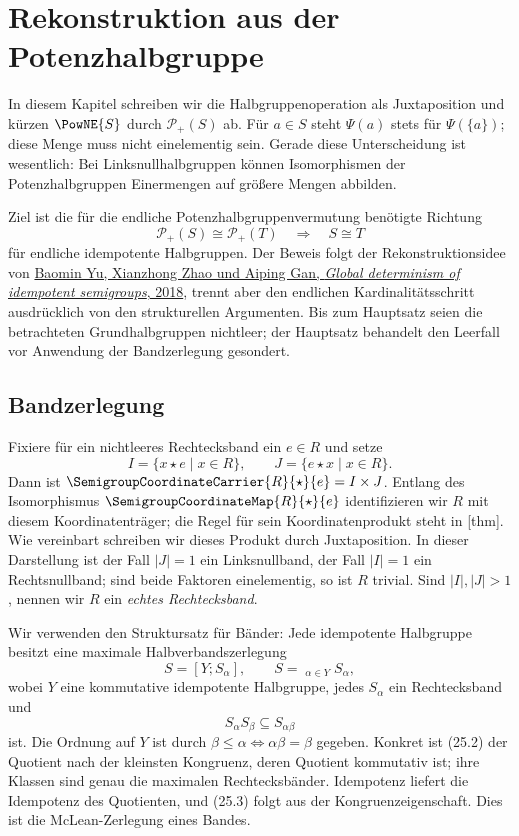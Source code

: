 \documentclass[main.tex]{subfiles}
\begin{document}
\chapter{Rekonstruktion aus der Potenzhalbgruppe}

In diesem Kapitel schreiben wir die Halbgruppenoperation als Juxtaposition
und kürzen \(\PowNE{S}\) durch \(\mathcal P_+(S)\) ab.  Für
\(a\in S\) steht \(\Psi(a)\) stets für \(\Psi(\{a\})\); diese Menge
muss nicht einelementig sein.  Gerade diese Unterscheidung ist wesentlich:
Bei Linksnullhalbgruppen können Isomorphismen der Potenzhalbgruppen
Einermengen auf größere Mengen abbilden.

Ziel ist die für die endliche Potenzhalbgruppenvermutung benötigte
Richtung
\[
  \mathcal P_+(S)\cong\mathcal P_+(T)
  \quad\Longrightarrow\quad S\cong T
\]
für endliche idempotente Halbgruppen.  Der Beweis folgt der
Rekonstruktionsidee von
\href{https://doi.org/10.1080/00927872.2017.1319474}%
  {Baomin Yu, Xianzhong Zhao und Aiping Gan,
  \emph{Global determinism of idempotent semigroups}, 2018},
trennt aber den endlichen Kardinalitätsschritt ausdrücklich von den
strukturellen Argumenten.
Bis zum Hauptsatz seien die betrachteten Grundhalbgruppen nichtleer; der
Hauptsatz behandelt den Leerfall vor Anwendung der Bandzerlegung gesondert.

\section{Bandzerlegung}

Fixiere f\"ur ein nichtleeres Rechtecksband ein \(e\in R\) und setze
\[
 I=\{x\star e\mid x\in R\},\qquad
 J=\{e\star x\mid x\in R\}.
\]
Dann ist \(\SemigroupCoordinateCarrier{R}{\star}{e}=I\times J\).
Entlang des Isomorphismus
\(\SemigroupCoordinateMap{R}{\star}{e}\) identifizieren wir \(R\) mit
diesem Koordinatentr\"ager; die Regel für sein Koordinatenprodukt steht in
[thm]. Wie vereinbart
schreiben wir dieses Produkt durch Juxtaposition.  In dieser Darstellung ist der Fall
\(|J|=1\) ein
Linksnullband, der Fall \(|I|=1\) ein Rechtsnullband; sind beide Faktoren
einelementig, so ist \(R\) trivial.  Sind \(|I|,|J|>1\), nennen wir
\(R\) ein \emph{echtes Rechtecksband}.

Wir verwenden den Struktursatz für Bänder: Jede idempotente Halbgruppe
besitzt eine maximale Halbverbandszerlegung
\[
  S=[Y;S_\alpha],\qquad
  S=\mathop{\dot\bigcup}_{\alpha\in Y}S_\alpha,           \tag{25.2}
\]
wobei \(Y\) eine kommutative idempotente Halbgruppe, jedes
\(S_\alpha\) ein Rechtecksband und
\[
  S_\alpha S_\beta\subseteq S_{\alpha\beta}              \tag{25.3}
\]
ist.  Die Ordnung auf \(Y\) ist durch
\(\beta\leq\alpha\iff\alpha\beta=\beta\) gegeben.
Konkret ist (25.2) der Quotient nach der kleinsten Kongruenz, deren
Quotient kommutativ ist; ihre Klassen sind genau die maximalen
Rechtecksbänder.  Idempotenz liefert die Idempotenz des Quotienten,
und (25.3) folgt aus der Kongruenzeigenschaft.  Dies ist die
McLean-Zerlegung eines Bandes.
\end{document}
